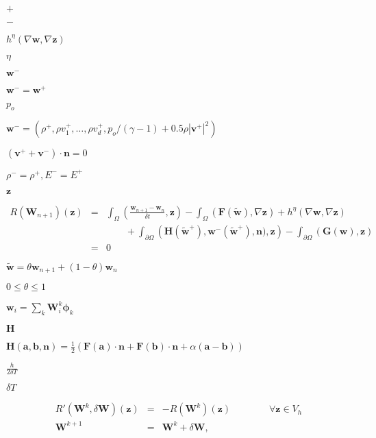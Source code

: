 \documentclass{article}
\begin{document}
$+$
\pagebreak

$-$
\pagebreak

$h^{\eta}(\nabla \mathbf{w} , \nabla \mathbf{z})$
\pagebreak

$\eta$
\pagebreak

$\mathbf{w}^-$
\pagebreak

$\mathbf{w}^- = \mathbf{w}^+$
\pagebreak

$p_o$
\pagebreak

$\mathbf{w}^- =(\rho^+, \rho v_1^+, \dots, \rho v_d^+, p_o/(\gamma -1) + 0.5 \rho |\mathbf{v}^+|^2)$
\pagebreak

$(\mathbf{v}^+ + \mathbf{v}^-) \cdot \mathbf{n} = 0$
\pagebreak

$\rho^- = \rho^+,E^-=E^+$
\pagebreak

$\mathbf z$
\pagebreak

\begin{eqnarray*} R(\mathbf{W}_{n+1})(\mathbf z) &=& \int_{\Omega} \left(\frac{\mathbf{w}_{n+1} - \mathbf{w}_n}{\delta t}, \mathbf{z}\right) - \int_{\Omega} \left(\mathbf{F}(\tilde{\mathbf{w}}), \nabla\mathbf{z}\right) + h^{\eta}(\nabla \mathbf{w} , \nabla \mathbf{z}) \\ && \qquad + \int_{\partial \Omega} \left(\mathbf{H}(\tilde{\mathbf{w}}^+), \mathbf{w}^-(\tilde{\mathbf{w}}^+), \mathbf{n}), \mathbf{z}\right) - \int_{\partial \Omega} \left(\mathbf{G}(\mathbf{w}), \mathbf{z}\right) \\ & = & 0 \end{eqnarray*}
\pagebreak

$\tilde{\mathbf{w}} = \theta \mathbf{w}_{n+1} + (1-\theta) \mathbf{w}_n$
\pagebreak

$0 \leq \theta \leq 1$
\pagebreak

$\mathbf{w}_i = \sum_k \mathbf{W}_i^k \mathbf{\phi}_k$
\pagebreak

$\mathbf H$
\pagebreak

$\mathbf{H}(\mathbf{a},\mathbf{b},\mathbf{n}) = \frac{1}{2}(\mathbf{F}(\mathbf{a})\cdot \mathbf{n} + \mathbf{F}(\mathbf{b})\cdot \mathbf{n} + \alpha (\mathbf{a} - \mathbf{b}))$
\pagebreak

$\frac{h}{2\delta T}$
\pagebreak

$\delta T$
\pagebreak

\begin{eqnarray*} R'(\mathbf{W}^k,\delta \mathbf{W})(\mathbf z) & = & - R(\mathbf{W}^{k})(\mathbf z) \qquad \qquad \forall \mathbf z\in V_h \\ \mathbf{W}^{k+1} &=& \mathbf{W}^k + \delta \mathbf{W}, \end{eqnarray*}
\pagebreak
\end{document}

